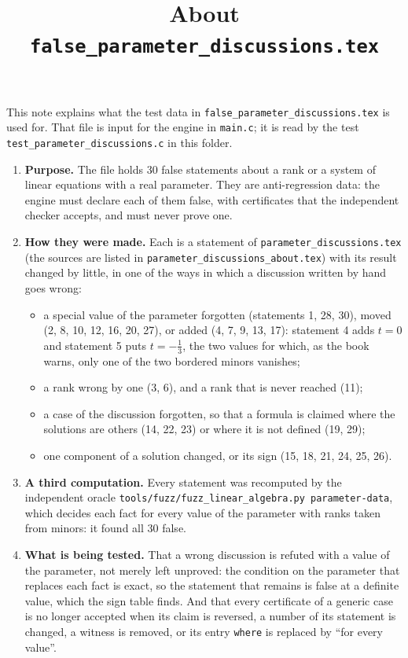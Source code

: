 \documentclass[11pt,a4paper]{article}
\title{About \texttt{false\_parameter\_discussions.tex}}
\author{}
\date{}
\begin{document}
\maketitle
This note explains what the test data in \texttt{false\_parameter\_discussions.tex} is used for. That file is input for the engine in \texttt{main.c}; it is read by the test \texttt{test\_parameter\_discussions.c} in this folder.

\begin{enumerate}
\item \textbf{Purpose.} The file holds 30 false statements about a rank or a system of linear equations with a real parameter. They are anti-regression data: the engine must declare each of them false, with certificates that the independent checker accepts, and must never prove one.

\item \textbf{How they were made.} Each is a statement of \texttt{parameter\_discussions.tex} (the sources are listed in \texttt{parameter\_discussions\_about.tex}) with its result changed by little, in one of the ways in which a discussion written by hand goes wrong:
\begin{itemize}
\item a special value of the parameter forgotten (statements 1, 28, 30), moved (2, 8, 10, 12, 16, 20, 27), or added (4, 7, 9, 13, 17): statement 4 adds $t = 0$ and statement 5 puts $t = -\frac{1}{3}$, the two values for which, as the book warns, only one of the two bordered minors vanishes;
\item a rank wrong by one (3, 6), and a rank that is never reached (11);
\item a case of the discussion forgotten, so that a formula is claimed where the solutions are others (14, 22, 23) or where it is not defined (19, 29);
\item one component of a solution changed, or its sign (15, 18, 21, 24, 25, 26).
\end{itemize}

\item \textbf{A third computation.} Every statement was recomputed by the independent oracle \texttt{tools/fuzz/fuzz\_linear\_algebra.py parameter-data}, which decides each fact for every value of the parameter with ranks taken from minors: it found all 30 false.

\item \textbf{What is being tested.} That a wrong discussion is refuted with a value of the parameter, not merely left unproved: the condition on the parameter that replaces each fact is exact, so the statement that remains is false at a definite value, which the sign table finds. And that every certificate of a generic case is no longer accepted when its claim is reversed, a number of its statement is changed, a witness is removed, or its entry \texttt{where} is replaced by ``for every value''.


\end{enumerate}
\end{document}
